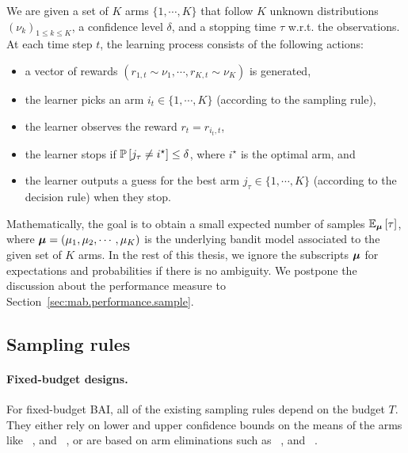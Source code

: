 \begin{definition}\label{def:mab.bai_confidence}
\begin{leftbar}[defnbar]
	We are given a set of $K$ arms $\{1,\cdots,K\}$ that follow $K$ unknown distributions $(\nu_k)_{1 \leq k \leq K}$, a confidence level $\delta$, and a stopping time $\tau$ w.r.t. the observations. At each time step $t$, the learning process consists of the following actions:
\begin{itemize}
	\item a vector of rewards $(r_{1,t} \sim \nu_1, \cdots, r_{K,t} \sim \nu_K)$ is generated,
	\item the learner picks an arm $i_t \in \{1,\cdots,K\}$ (according to the sampling rule),
	\item the learner observes the reward $r_t = r_{i_t, t}$,
	\item the learner stops if $\mathbb{P}\left[j_{\tau}\neq i^{\star}\right] \leq \delta$, where $i^{\star}$ is the optimal arm, and
	\item the learner outputs a guess for the best arm $j_\tau \in \{1,\cdots,K\}$ (according to the decision rule) when they stop.
\end{itemize}
\end{leftbar}
\end{definition}

Mathematically, the goal is to obtain a small expected number of samples $\mathbb{E}_{{\boldsymbol \mu}}\left[\tau\right]$, where ${\boldsymbol \mu}=(\mu_1,\mu_2,\cdots,\mu_K)$ is the underlying bandit model associated to the given set of $K$ arms. In the rest of this thesis, we ignore the subscripts ${\boldsymbol \mu}$ for expectations and probabilities if there is no ambiguity. We postpone the discussion about the performance measure to Section~\ref{sec:mab.performance.sample}.

\subsection{Sampling rules}\label{sec:mab.bai.sampling}

\paragraph{Fixed-budget designs.}

For fixed-budget BAI, all of the existing sampling rules depend on the budget $T$. They either rely on lower and upper confidence bounds on the means of the arms like \UCBE~\citep{audibert2010budget}, and \UGapE~\citep{gabillon2012ugape}, or are based on arm eliminations such as \SR~\citep{audibert2010budget}, and \SHA~\citep{karnin2013sha}.

